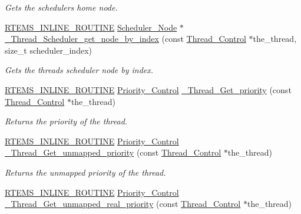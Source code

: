 \begin{DoxyCompactItemize}
\begin{DoxyCompactList}\small\item\em Gets the scheduler\textquotesingle{}s home node. \end{DoxyCompactList}\item 
\mbox{\hyperlink{group__RTEMSScoreBaseDefs_gac216239df231d5dbd15e3520b0b9313f}{R\+T\+E\+M\+S\+\_\+\+I\+N\+L\+I\+N\+E\+\_\+\+R\+O\+U\+T\+I\+NE}} \mbox{\hyperlink{structScheduler__Node}{Scheduler\+\_\+\+Node}} $\ast$ \mbox{\hyperlink{group__RTEMSScoreThread_ga03136c6e5b56781aeff0ace838556d67}{\+\_\+\+Thread\+\_\+\+Scheduler\+\_\+get\+\_\+node\+\_\+by\+\_\+index}} (const \mbox{\hyperlink{struct__Thread__Control}{Thread\+\_\+\+Control}} $\ast$the\+\_\+thread, size\+\_\+t scheduler\+\_\+index)
\begin{DoxyCompactList}\small\item\em Gets the thread\textquotesingle{}s scheduler node by index. \end{DoxyCompactList}\item 
\mbox{\hyperlink{group__RTEMSScoreBaseDefs_gac216239df231d5dbd15e3520b0b9313f}{R\+T\+E\+M\+S\+\_\+\+I\+N\+L\+I\+N\+E\+\_\+\+R\+O\+U\+T\+I\+NE}} \mbox{\hyperlink{group__RTEMSScorePriority_ga59d02b58072d31a9a1cfe644557aefe2}{Priority\+\_\+\+Control}} \mbox{\hyperlink{group__RTEMSScoreThread_ga3107774ee53fe4ac8323ba4a0f48f8bc}{\+\_\+\+Thread\+\_\+\+Get\+\_\+priority}} (const \mbox{\hyperlink{struct__Thread__Control}{Thread\+\_\+\+Control}} $\ast$the\+\_\+thread)
\begin{DoxyCompactList}\small\item\em Returns the priority of the thread. \end{DoxyCompactList}\item 
\mbox{\hyperlink{group__RTEMSScoreBaseDefs_gac216239df231d5dbd15e3520b0b9313f}{R\+T\+E\+M\+S\+\_\+\+I\+N\+L\+I\+N\+E\+\_\+\+R\+O\+U\+T\+I\+NE}} \mbox{\hyperlink{group__RTEMSScorePriority_ga59d02b58072d31a9a1cfe644557aefe2}{Priority\+\_\+\+Control}} \mbox{\hyperlink{group__RTEMSScoreThread_ga6fe9824bbef3afafec8782dc3d95b6ce}{\+\_\+\+Thread\+\_\+\+Get\+\_\+unmapped\+\_\+priority}} (const \mbox{\hyperlink{struct__Thread__Control}{Thread\+\_\+\+Control}} $\ast$the\+\_\+thread)
\begin{DoxyCompactList}\small\item\em Returns the unmapped priority of the thread. \end{DoxyCompactList}\item 
\mbox{\hyperlink{group__RTEMSScoreBaseDefs_gac216239df231d5dbd15e3520b0b9313f}{R\+T\+E\+M\+S\+\_\+\+I\+N\+L\+I\+N\+E\+\_\+\+R\+O\+U\+T\+I\+NE}} \mbox{\hyperlink{group__RTEMSScorePriority_ga59d02b58072d31a9a1cfe644557aefe2}{Priority\+\_\+\+Control}} \mbox{\hyperlink{group__RTEMSScoreThread_ga3e830e160eb3f7511ae2cab7b11023a8}{\+\_\+\+Thread\+\_\+\+Get\+\_\+unmapped\+\_\+real\+\_\+priority}} (const \mbox{\hyperlink{struct__Thread__Control}{Thread\+\_\+\+Control}} $\ast$the\+\_\+thread)

\end{DoxyCompactItemize}
